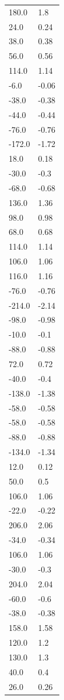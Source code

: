 \begin{longtable}{ll}
180.0 & 1.8 \\
24.0 & 0.24 \\
38.0 & 0.38 \\
56.0 & 0.56 \\
114.0 & 1.14 \\
-6.0 & -0.06 \\
-38.0 & -0.38 \\
-44.0 & -0.44 \\
-76.0 & -0.76 \\
-172.0 & -1.72 \\
18.0 & 0.18 \\
-30.0 & -0.3 \\
-68.0 & -0.68 \\
136.0 & 1.36 \\
98.0 & 0.98 \\
68.0 & 0.68 \\
114.0 & 1.14 \\
106.0 & 1.06 \\
116.0 & 1.16 \\
-76.0 & -0.76 \\
-214.0 & -2.14 \\
-98.0 & -0.98 \\
-10.0 & -0.1 \\
-88.0 & -0.88 \\
72.0 & 0.72 \\
-40.0 & -0.4 \\
-138.0 & -1.38 \\
-58.0 & -0.58 \\
-58.0 & -0.58 \\
-88.0 & -0.88 \\
-134.0 & -1.34 \\
12.0 & 0.12 \\
50.0 & 0.5 \\
106.0 & 1.06 \\
-22.0 & -0.22 \\
206.0 & 2.06 \\
-34.0 & -0.34 \\
106.0 & 1.06 \\
-30.0 & -0.3 \\
204.0 & 2.04 \\
-60.0 & -0.6 \\
-38.0 & -0.38 \\
158.0 & 1.58 \\
120.0 & 1.2 \\
130.0 & 1.3 \\
40.0 & 0.4 \\
26.0 & 0.26 \\

\end{longtable}
